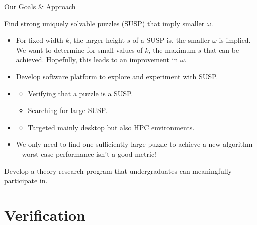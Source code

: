 \documentclass[t,10pt,
mathserif,xcolor=dvipsnames]{beamer}
\begin{document}
\begin{myframe}{Our Goals \& Approach}

   Find strong uniquely solvable puzzles (SUSP) that imply smaller $\omega$.

  \medskip
  
  \begin{itemize}
  \item For fixed width $k$, the larger height $s$ of a SUSP is, the
    smaller $\omega$ is implied. We want to determine for small values
    of $k$, the maximum $s$ that can be achieved.  Hopefully, this
    leads to an improvement in $\omega$.
  \item Develop software platform to explore and experiment with SUSP.
  \item {}
    \begin{itemize}
    \item Verifying that a puzzle is a SUSP.
    \item Searching for large SUSP.
    \end{itemize}
  \item {}
    \begin{itemize}
    \item Targeted mainly desktop but also HPC environments.
    \end{itemize}
  \item We only need to find one sufficiently large puzzle to achieve
    a new algorithm -- worst-case performance isn't a good metric!
  \end{itemize}

  \medskip
  
   Develop a theory research program that
  undergraduates can meaningfully participate in.
  
  
  
\end{myframe}

\section{Verification}


\newcommand\coNP{\ensuremath{\mathrm{coNP}}}
\end{document}
